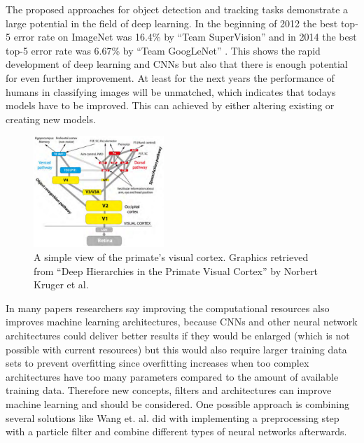 \documentclass[12pt,twoside]{article}
\theoremstyle{plain}
\theoremstyle{definition}
\theoremstyle{remark}
\begin{document}
The proposed approaches for object detection and tracking tasks demonstrate a large potential in the field of deep learning.
In the beginning of 2012 the best top-5 error rate on ImageNet was 16.4\% by \enquote{Team SuperVision} and in 2014 the best top-5 error rate was 6.67\% by \enquote{Team GoogLeNet} \cite{GoogLeNet}. This shows the rapid development of deep learning and CNNs but also that there is enough potential for even further improvement. At least for the next years the performance of humans in classifying images will be unmatched, which indicates that todays models have to be improved. This can achieved by either altering existing or creating new models.
\begin{figure}
	\vspace{-15pt}
	\centerline{
		\includegraphics[width=0.438\textwidth]{VisualCortex.pdf}
	}
	{\caption{A simple view of the primate's visual cortex. Graphics retrieved from \enquote{Deep Hierarchies in the Primate Visual Cortex} by Norbert Kruger et al. \cite{DeepHierarchiesVisualCortex-kruger}}\label{fig:visual-cortex}
	}
\end{figure}
In many papers \cite{GoogLeNet, DeepNeuralNetworksObjectDetection-Szegedy, ImangeNetClassificationCNN-Krizhevsky, LearningDeepCompactImageTracking-Wang, MultiColumnDeepNeuralNetworksClassification-Ciresan} researchers say improving the computational resources also improves machine learning architectures, because CNNs and other neural network architectures could deliver better results if they would be enlarged (which is not possible with current resources) but this would also require larger training data sets to prevent overfitting since overfitting increases when too complex architectures have too many parameters compared to the amount of available training data. Therefore new concepts, filters and architectures can improve machine learning and should be considered. One possible approach is combining several solutions like Wang et. al.  \cite{LearningDeepCompactImageTracking-Wang} did with implementing a preprocessing step with a particle filter and combine different types of neural networks afterwards.
\end{document}
